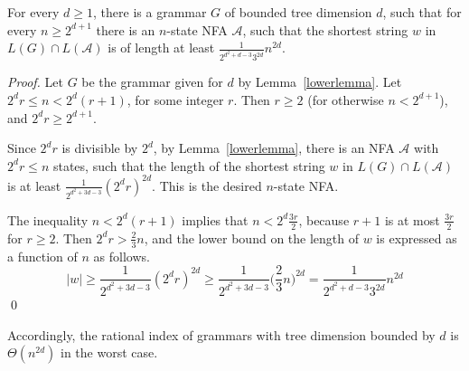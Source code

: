 \documentclass[runningheads]{llncs}
\begin{document}
\begin{theorem}\label{lower_bound_theorem}
For every $d \geqslant 1$,
there is a grammar $G$ of bounded tree dimension $d$,
such that for every $n \geqslant 2^{d+1}$
there is an $n$-state NFA $\mathcal{A}$,
such that the shortest string $w$ in $L(G) \cap L(\mathcal{A})$
is of length at least $\frac{1}{2^{d^2 + d - 3} 3^{2d}} n^{2d}$.
\end{theorem}
\begin{proof}
Let $G$ be the grammar given for $d$ by Lemma~\ref{lowerlemma}.
Let $2^d r \leqslant n < 2^d (r+1)$, for some integer $r$.
Then $r \geqslant 2$ (for otherwise $n < 2^{d+1}$),
and $2^d r \geqslant 2^{d+1}$.

Since $2^d r$ is divisible by $2^d$,
by Lemma~\ref{lowerlemma},
there is an NFA $\mathcal{A}$ with $2^d r \leqslant n$ states,
such that the length of the shortest string $w$ in $L(G) \cap L(\mathcal{A})$
is at least $\frac{1}{2^{d^2 + 3d - 3}} (2^d r)^{2d}$.
This is the desired $n$-state NFA.


The inequality $n < 2^d (r+1)$ implies that $n < 2^d \frac{3r}{2}$,
because $r+1$ is at most $\frac{3r}{2}$ for $r \geqslant 2$.
Then $2^d r > \frac{2}{3}n$,
and the lower bound on the length of $w$ is expressed as a function of $n$
as follows.
\begin{equation*}
	|w|
		\geqslant
	\frac{1}{2^{d^2 + 3d - 3}} (2^d r)^{2d}
		\geqslant
	\frac{1}{2^{d^2 + 3d - 3}} \big(\frac{2}{3} n\big)^{2d}
		=
	\frac{1}{2^{d^2 + d - 3} 3^{2d}} n^{2d}
\end{equation*}
\qed
\end{proof}

Accordingly,
the rational index of grammars with tree dimension bounded by $d$
is $\Theta(n^{2d})$ in the worst case.

\end{document}
